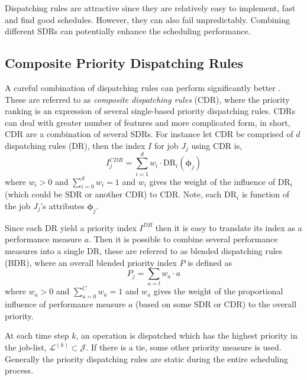 \documentclass[smallextended]{svjour3}
\renewcommand{\vphi}{\bm \phi}
\begin{document}
Dispatching rules are attractive
since they are relatively easy to implement, fast and find good
schedules. However, they can also fail unpredictably. Combining
different SDRs can potentially enhance the
scheduling performance. 
	
	
\subsection{Composite Priority Dispatching Rules}\label{sec:CDR}
A careful combination of dispatching rules can perform significantly
better \cite{Jayamohan04}. These are referred to as \emph{composite
  dispatching rules} (CDR), where the priority ranking is an
expression of several single-based priority dispatching rules. CDRs
can deal with greater number of features and more complicated form, in
short, CDR are a combination of several SDRs. For instance let CDR be
comprised of $d$ dispatching rules (DR), then the index $I$ for job $J_j$ using CDR is,
\begin{equation}
  I_j^{CDR} = \sum_{i=1}^d w_i \cdot \text{DR}_i(\vphi_j) \label{eq:CDR}
\end{equation}
where $w_i>0$ and $\sum_{i=0}^d w_i = 1$ and $w_i$ gives the weight of
the influence of $\text{DR}_i$ (which could be SDR or another CDR) to
CDR. Note, each $\text{DR}_i$ is function of the job $J_j$'s attributes
 $\vphi_j$.   
	
Since each DR yield a priority index $I^{DR}$ then it is easy to
translate its index as a performance measure $a$. Then it is possible
to combine several performance measures into a single DR, these are
referred to as blended dispatching rules (BDR), where an overall
blended priority index $P$ is defined as
\begin{equation}
  P_j = \sum_{a=l} w_a \cdot a 
\end{equation}
where $w_a>0$ and $\sum_{a=0}^C w_a = 1$ and $w_a$ gives the weight of
the proportional influence of performance measure $a$ (based on some
SDR or CDR) to the overall priority.


At each time step $k$, an operation is dispatched which has the
highest priority in the job-list,
$\mathcal{L}^{(k)}\subset\mathcal{J}$.  If there is a tie, some other priority measure
is used. Generally the priority dispatching rules are static during
the entire scheduling process.
	
\end{document}
